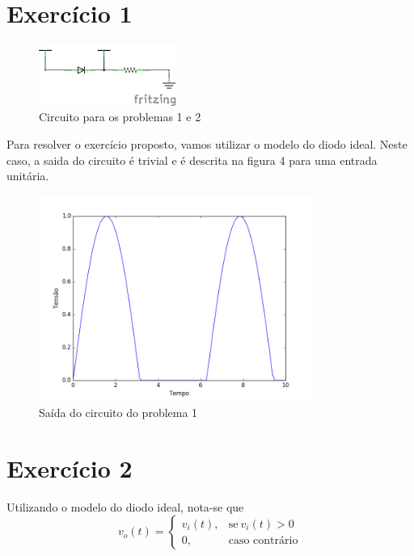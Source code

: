 \documentclass[12pt, a4paper, twoside]{article}
\begin{document}
\section{Exercício 1}

\begin{figure}[H]
    \centering
    \includegraphics[width=0.4\textwidth]{figs/rel3/c1.png}
    \caption{Circuito para os problemas 1 e 2}
\end{figure}

Para resolver o exercício proposto, vamos utilizar o modelo do diodo ideal. Neste caso,
a saida do circuito é trivial e é descrita na figura 4 para uma entrada unitária.

\begin{figure}[H]
    \centering
    \includegraphics[width=0.8\textwidth]{figs/rel3/ex1.png}
    \caption{Saída do circuito do problema 1}
\end{figure}

\section{Exercício 2}

Utilizando o modelo do diodo ideal, nota-se que
\begin{equation}
    v_o(t) =
    \begin{cases}
        v_i(t), & \text{se}\ v_i(t) > 0 \\
        0, & \text{caso contrário}
    \end{cases}
\end{equation}
\end{document}
